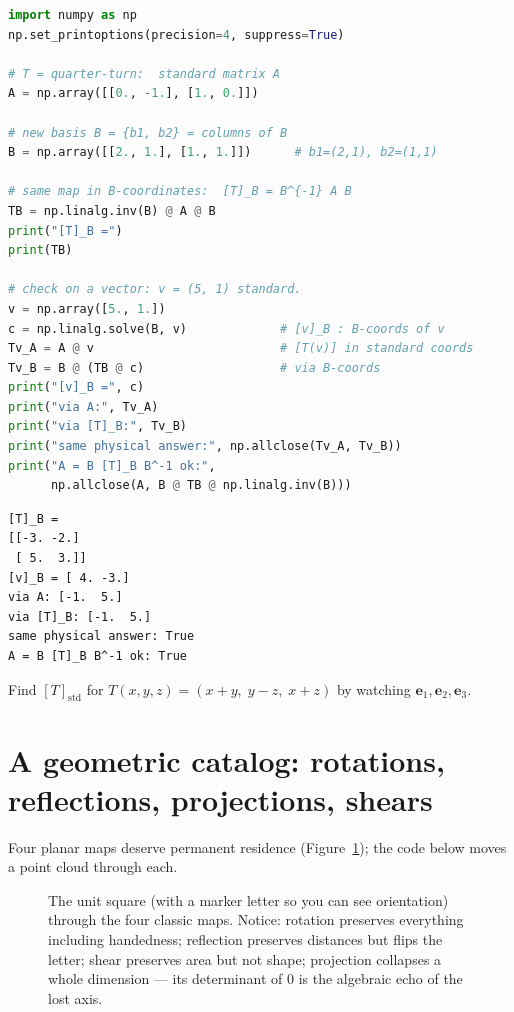 \begin{lstlisting}[language=Python,caption={Change of basis, done both ways on the same vector. File: \texttt{code/ch04\_change\_basis.py}.},label={lst:changebasis}]
import numpy as np
np.set_printoptions(precision=4, suppress=True)

# T = quarter-turn:  standard matrix A
A = np.array([[0., -1.], [1., 0.]])

# new basis B = {b1, b2} = columns of B
B = np.array([[2., 1.], [1., 1.]])      # b1=(2,1), b2=(1,1)

# same map in B-coordinates:  [T]_B = B^{-1} A B
TB = np.linalg.inv(B) @ A @ B
print("[T]_B =")
print(TB)

# check on a vector: v = (5, 1) standard.
v = np.array([5., 1.])
c = np.linalg.solve(B, v)             # [v]_B : B-coords of v
Tv_A = A @ v                          # [T(v)] in standard coords
Tv_B = B @ (TB @ c)                   # via B-coords
print("[v]_B =", c)
print("via A:", Tv_A)
print("via [T]_B:", Tv_B)
print("same physical answer:", np.allclose(Tv_A, Tv_B))
print("A = B [T]_B B^-1 ok:",
      np.allclose(A, B @ TB @ np.linalg.inv(B)))
\end{lstlisting}

\begin{lstlisting}[caption={Output of listing~\ref{lst:changebasis}. The two matrices look nothing alike yet produce identical physical outputs — similarity is sameness of map, not sameness of entries.}]
[T]_B =
[[-3. -2.]
 [ 5.  3.]]
[v]_B = [ 4. -3.]
via A: [-1.  5.]
via [T]_B: [-1.  5.]
same physical answer: True
A = B [T]_B B^-1 ok: True
\end{lstlisting}

\begin{exercise}[easy]
Find $[T]_{\text{std}}$ for $T(x,y,z)=(x+y,\;y-z,\;x+z)$ by watching $\mathbf e_1,\mathbf e_2,\mathbf e_3$.
\end{exercise}

\section{A geometric catalog: rotations, reflections, projections, shears}\label{sec:gallery}

Four planar maps deserve permanent residence (Figure~\ref{fig:gallery}); the code below moves a point cloud through each.

\begin{figure}[htbp]
\centering

\caption{The unit square (with a marker letter so you can see orientation) through the four classic maps. Notice: rotation preserves everything including handedness; reflection preserves distances but flips the letter; shear preserves area but not shape; projection collapses a whole dimension — its determinant of $0$ is the algebraic echo of the lost axis.}
\label{fig:gallery}
\end{figure}

